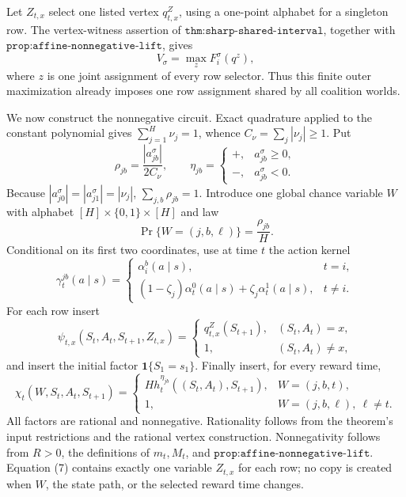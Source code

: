 Let \(Z_{t,x}\) select one listed vertex \(q^Z_{t,x}\), using a one-point alphabet for a singleton row.  The vertex-witness assertion of \(\texttt{thm:sharp-shared-interval}\), together with \(\texttt{prop:affine-nonnegative-lift}\), gives
\[
 V_\sigma=\max_z F_i^\sigma(q^z),
 \tag{3}
\]
where \(z\) is one joint assignment of every row selector.  Thus this finite outer maximization already imposes one row assignment shared by all coalition worlds.

We now construct the nonnegative circuit.  Exact quadrature applied to the constant polynomial gives \(\sum_{j=1}^H\nu_j=1\), whence \(C_\nu=\sum_j|\nu_j|\ge1\).  Put
\[
 \rho_{jb}=\frac{|a_{jb}^\sigma|}{2C_\nu},
 \qquad
 \eta_{jb}=\begin{cases}+,&a_{jb}^\sigma\ge0,\\-,&a_{jb}^\sigma<0.\end{cases}
 \tag{4}
\]
Because \(|a_{j0}^\sigma|=|a_{j1}^\sigma|=|\nu_j|\), \(\sum_{j,b}\rho_{jb}=1\).  Introduce one global chance variable \(W\) with alphabet \([H]\times\{0,1\}\times[H]\) and law
\[
 \Pr\{W=(j,b,\ell)\}=\frac{\rho_{jb}}{H}.
 \tag{5}
\]
Conditional on its first two coordinates, use at time \(t\) the action kernel
\[
 \gamma_t^{jb}(a\mid s)=
 \begin{cases}
  \alpha_i^b(a\mid s),&t=i,\\
  (1-\zeta_j)\alpha_t^0(a\mid s)+\zeta_j\alpha_t^1(a\mid s),&t\ne i.
 \end{cases}
 \tag{6}
\]
For each row insert
\[
 \psi_{t,x}(S_t,A_t,S_{t+1},Z_{t,x})=
 \begin{cases}
 q^{Z}_{t,x}(S_{t+1}),&(S_t,A_t)=x,\\
 1,&(S_t,A_t)\ne x,
 \end{cases}
 \tag{7}
\]
and insert the initial factor \(\mathbf 1\{S_1=s_1\}\).  Finally insert, for every reward time,
\[
 \chi_t(W,S_t,A_t,S_{t+1})=
 \begin{cases}
 Hh_t^{\eta_{jb}}((S_t,A_t),S_{t+1}),&W=(j,b,t),\\
 1,&W=(j,b,\ell),\ \ell\ne t.
 \end{cases}
 \tag{8}
\]
All factors are rational and nonnegative.  Rationality follows from the theorem's input restrictions and the rational vertex construction.  Nonnegativity follows from \(R>0\), the definitions of \(m_t,M_t\), and \(\texttt{prop:affine-nonnegative-lift}\).  Equation (7) contains exactly one variable \(Z_{t,x}\) for each row; no copy is created when \(W\), the state path, or the selected reward time changes.

